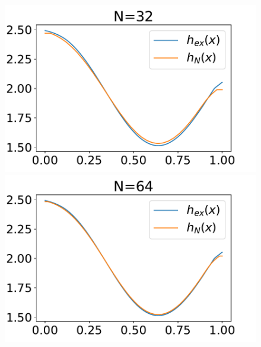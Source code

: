 \documentclass[
11pt, %
francais, %
singlespacing, %
headsepline, %
f%
]{MastersDoctoralThesis} %
\theoremstyle{definition}
\begin{document}
\begin{figure}
\includegraphics[scale = .6]{testconv32}
\includegraphics[scale = .6]{testconv64} 
\end{figure}
\end{document}
